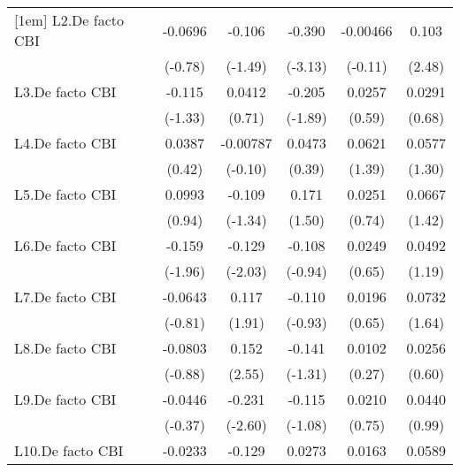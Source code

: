 {\begin{longtable}{l*{5}{c}}
[1em]
L2.De facto CBI &  -0.0696         &   -0.106         &   -0.390\sym{**} & -0.00466         &    0.103\sym{*}  \\
                &  (-0.78)         &  (-1.49)         &  (-3.13)         &  (-0.11)         &   (2.48)         \\
[1em]
L3.De facto CBI &   -0.115         &   0.0412         &   -0.205         &   0.0257         &   0.0291         \\
                &  (-1.33)         &   (0.71)         &  (-1.89)         &   (0.59)         &   (0.68)         \\
[1em]
L4.De facto CBI &   0.0387         & -0.00787         &   0.0473         &   0.0621         &   0.0577         \\
                &   (0.42)         &  (-0.10)         &   (0.39)         &   (1.39)         &   (1.30)         \\
[1em]
L5.De facto CBI &   0.0993         &   -0.109         &    0.171         &   0.0251         &   0.0667         \\
                &   (0.94)         &  (-1.34)         &   (1.50)         &   (0.74)         &   (1.42)         \\
[1em]
L6.De facto CBI &   -0.159         &   -0.129\sym{*}  &   -0.108         &   0.0249         &   0.0492         \\
                &  (-1.96)         &  (-2.03)         &  (-0.94)         &   (0.65)         &   (1.19)         \\
[1em]
L7.De facto CBI &  -0.0643         &    0.117         &   -0.110         &   0.0196         &   0.0732         \\
                &  (-0.81)         &   (1.91)         &  (-0.93)         &   (0.65)         &   (1.64)         \\
[1em]
L8.De facto CBI &  -0.0803         &    0.152\sym{*}  &   -0.141         &   0.0102         &   0.0256         \\
                &  (-0.88)         &   (2.55)         &  (-1.31)         &   (0.27)         &   (0.60)         \\
[1em]
L9.De facto CBI &  -0.0446         &   -0.231\sym{*}  &   -0.115         &   0.0210         &   0.0440         \\
                &  (-0.37)         &  (-2.60)         &  (-1.08)         &   (0.75)         &   (0.99)         \\
[1em]
L10.De facto CBI&  -0.0233         &   -0.129         &   0.0273         &   0.0163         &   0.0589         \\

\end{longtable}}

